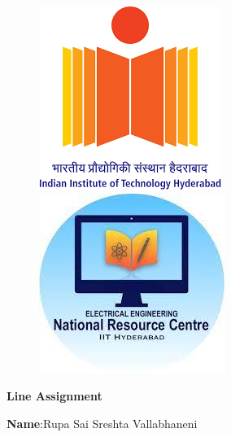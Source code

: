 \documentclass[10pt,a4paper]{report}
\begin{document}
\begin{figure}[!tbp]
  \centering
  \begin{minipage}[b]{0.4\textwidth}
   \includegraphics[scale=0.5]{iithlogo.png} 
  \end{minipage}
  \hfill
  \vspace{5mm}\begin{minipage}[b]{0.4\textwidth}
\raggedleft \includegraphics[scale=0.5]{nrc.jpeg} 
  \end{minipage}\vspace{0.2cm}
\end{figure}
\raggedright 
\begin{center}
\Large \textbf{Line Assignment}\hspace{2.5cm} %
\end{center}
\begin{center}
\hspace{0.5cm}
\textbf{Name}:\hspace{2mm}Rupa Sai Sreshta Vallabhaneni\hspace{1cm}
\date{25-September-2022}

\end{center}
\end{document}
